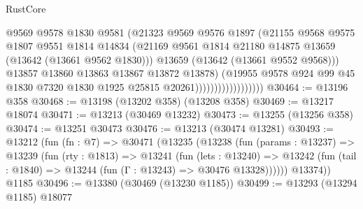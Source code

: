 \begin{lexlean}{RustCore}
\begin{coremodule}
                                      @9569
                                      @9578
                                      @1830
                                      @9581
                                      (@21323
                                        @9569
                                        @9576
                                        @1897
                                        (@21155
                                          @9568
                                          @9575
                                          @1807
                                          @9551
                                          @1814
                                          @14834
                                          (@21169
                                            @9561
                                            @1814
                                            @21180
                                            @14875
                                            @13659
                                            (@13642 (@13661 @9562 @1830)))
                                          @13659
                                          (@13642 (@13661 @9552 @9568)))
                                        @13857
                                        @13860
                                        @13863
                                        @13867
                                        @13872
                                        @13878)
                                      (@19955
                                        @9578
                                        @924
                                        @99
                                        @45
                                        @1830
                                        @7320
                                        @1830
                                        @1925
                                        @25815
                                        @20261))))))))))))))))))
@30464 := @13196 @358
@30468 := @13198 (@13202 @358) (@13208 @358)
@30469 := @13217 @18074
@30471 := @13213 (@30469 @13232)
@30473 := @13255 (@13256 @358)
@30474 := @13251 @30473
@30476 := @13213 (@30474 @13281)
@30493 := @13212
    (fun (fn : @7) =>
    @30471
      (@13235
        (@13238
          (fun (params : @13237) =>
          @13239
            (fun (rty : @1813) =>
            @13241
              (fun (lets : @13240) =>
              @13242 (fun (tail : @1840) => @13244 (fun (Γ : @13243) => @30476 @13328))))))
        @13374))
    @1185
@30496 := @13380 (@30469 (@13230 @1185))
@30499 := @13293 (@13294 @1185) @18077

\end{coremodule}
\end{lexlean}
